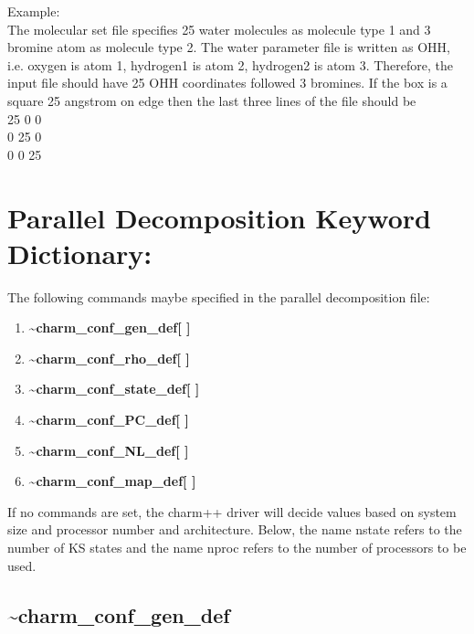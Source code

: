 \documentclass[12pt]{article}
\begin{document}
Example: \\ 
The molecular set file specifies 25 water molecules as molecule
type 1 and 3 bromine atom as molecule type 2. The water parameter file is 
written as OHH, i.e. oxygen is atom 1, hydrogen1 is atom 2, hydrogen2 is 
atom 3. Therefore, the input file should have 25 OHH coordinates followed
3 bromines. If the box is a square 25 angstrom on edge 
then the last three lines of the file should be \\
\hspace*{1.5in}  25  0  0  \\
\hspace*{1.5in}  0  25  0  \\
\hspace*{1.5in}  0  0   25 \\

\newpage
\section*{\bf Parallel Decomposition Keyword Dictionary: } 

The following commands maybe specified in the parallel decomposition file:
\begin{enumerate}
\item {\bf \~{ }charm\_conf\_gen\_def[ ]}
\item {\bf \~{ }charm\_conf\_rho\_def[ ]}
\item {\bf \~{ }charm\_conf\_state\_def[ ]}
\item {\bf \~{ }charm\_conf\_PC\_def[ ]}
\item {\bf \~{ }charm\_conf\_NL\_def[ ]}
\item {\bf \~{ }charm\_conf\_map\_def[ ]}
\end{enumerate}
If no commands are set, the charm++ driver will decide values based
on system size and processor number and architecture. Below, the 
name nstate refers to the number of KS states and the name nproc
refers to the number of processors to be used.

\newpage
\subsection*{\bf \~{ }charm\_conf\_gen\_def}
\end{document}
